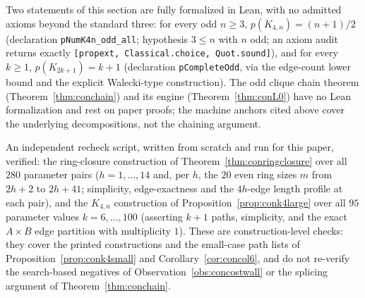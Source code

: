Two statements of this section are fully formalized in Lean, with no
admitted axioms beyond the standard three: for every odd $n\ge3$,
$p(K_{4,n})=(n+1)/2$ (declaration \texttt{pNumK4n\_odd\_all}; hypothesis
$3\le n$ with $n$ odd; an axiom audit returns exactly
\texttt{[propext, Classical.choice, Quot.sound]}), and for every $k\ge1$,
$p(K_{2k+1})=k+1$ (declaration \texttt{pCompleteOdd}, via the edge-count
lower bound and the explicit Walecki-type construction). The odd clique
chain theorem (Theorem~\ref{thm:conchain}) and its engine
(Theorem~\ref{thm:conL0}) have no Lean formalization and rest on paper
proofs; the machine anchors cited above cover the underlying
decompositions, not the chaining argument.

An independent recheck script, written from scratch and run for this
paper, verified: the ring-closure construction of
Theorem~\ref{thm:conringclosure} over all $280$ parameter pairs
($h=1,\dots,14$ and, per $h$, the $20$ even ring sizes $m$ from $2h+2$ to
$2h+41$; simplicity, edge-exactness and the $4h$-edge length profile at
each pair), and the $K_{4,n}$ construction of
Proposition~\ref{prop:conk4large} over all $95$ parameter values
$k=6,\dots,100$ (asserting $k+1$ paths, simplicity, and the exact
$A\times B$ edge partition with multiplicity $1$). These are
construction-level checks: they cover the printed constructions and the
small-case path lists of Proposition~\ref{prop:conk4small} and
Corollary~\ref{cor:concol6}, and do not re-verify the search-based
negatives of Observation~\ref{obs:concostwall} or the splicing argument of
Theorem~\ref{thm:conchain}.
